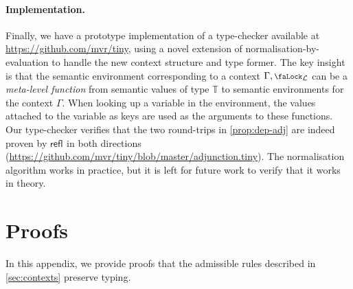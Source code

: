 \documentclass[10pt]{article}
\theoremstyle{definition}
\let\oldequiv\equiv%
\renewcommand{\equiv}{\simeq}
\newcommand{\defeq}{\oldequiv}
\newcommand*{\refl}[1]{\mathsf{refl}_{#1}}
\newcommand{\lock}{\mathchoice {\scalebox{0.8}{\text{\faLock}}}
  {\scalebox{0.8}{\text{\faLock}}} {\scalebox{0.5}{\text{\faLock}}}
  {\scalebox{0.4}{\text{\faLock}}} }
\newcommand{\rbindsym}{%
  \mathchoice
    {\reflectbox{\rotatebox[origin=c]{185}{$\lambda$}}}  %
    {\reflectbox{\rotatebox[origin=c]{185}{$\lambda$}}}  %
    {\reflectbox{\rotatebox[origin=c]{185}{$\scriptstyle\lambda$}}}  %
    {\reflectbox{\rotatebox[origin=c]{185}{$\scriptscriptstyle\lambda$}}}  %
  }
\newcommand{\rbind}[1]{\rbindsym{} #1.}
\newcommand{\Tiny}{\mathbb{T}}
\newcommand{\lockn}[1]{\mathcal{#1}}
\newcommand{\ctxlocke}[1]{\lock_{#1}}
\newcommand{\ctxlock}[1]{\ctxlocke{\lockn{#1}}}
\newcommand{\stubra}[1]{\{\!\!\{ #1 \}\!\!\}}
\newcommand{\admbra}[1]{\{\mkern-1mu #1 \mkern-0.5mu\}}
\newcommand{\substuck}[2]{\stubra{#1/\lockn{#2}}}
\newcommand{\sublock}[2]{\admbra{\rbindsym{} #1. /\lockn{#2} }}
\begin{document}

\paragraph{Implementation.} Finally, we have a prototype
implementation of a type-checker available at
\url{https://github.com/mvr/tiny}, using a novel extension of
normalisation-by-evaluation to handle the new context structure and
type former. The key insight is that the semantic environment
corresponding to a context $\Gamma, \ctxlock{L}$ can be a
\emph{meta-level function} from semantic values of type $\Tiny$ to semantic
environments for the context $\Gamma$. When looking up a variable in
the environment, the values attached to the variable as keys are used
as the arguments to these functions. Our type-checker verifies that
the two round-trips in \cref{prop:dep-adj} are indeed proven by
$\refl{}$ in both directions
(\url{https://github.com/mvr/tiny/blob/master/adjunction.tiny}). The
normalisation algorithm works in practice, but it is left for future
work to verify that it works in theory.

\printbibliography

\appendix

\section{Proofs}\label{sec:proofs}

In this appendix, we provide proofs that the admissible rules described in
\cref{sec:contexts} preserve typing.
\end{document}
